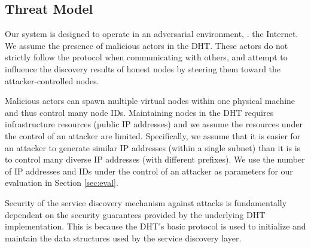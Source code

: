 \subsection{Threat Model}

Our system is designed to operate in an adversarial environment, \ie. the Internet. We assume the presence of malicious actors in the DHT. These actors do not strictly follow the protocol when communicating with others, and attempt to influence the discovery results of honest nodes by steering them toward the attacker-controlled nodes.

Malicious actors can spawn multiple virtual nodes within one physical machine and thus control many node IDs. Maintaining nodes in the DHT requires infrastructure resources (public IP addresses) and we assume the resources under the control of an attacker are limited. Specifically, we assume that it is easier for an attacker to generate similar IP addresses (within a single subnet) than it is is to control many diverse IP addresses (with different prefixes). We use the number of IP addresses and IDs under the control of an attacker as parameters for our evaluation in Section \ref{sec:eval}.

Security of the service discovery mechanism against attacks is fundamentally dependent on the security guarantees provided by the underlying DHT implementation. This is because the DHT's basic protocol is used to initialize and maintain the data structures used by the service discovery layer.


%
